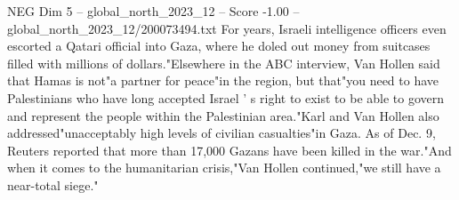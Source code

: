 \begin{textsample}{NEG Dim 5 – global\_north\_2023\_12 – Score -1.00 – global\_north\_2023\_12/200073494.txt}
For years, Israeli intelligence officers even escorted a Qatari official into Gaza, where he doled out money from suitcases filled with millions of dollars."Elsewhere in the ABC interview, Van Hollen said that Hamas is not"a partner for peace"in the region, but that"you need to have Palestinians who have long accepted Israel ' s right to exist to be able to govern and represent the people within the Palestinian area."Karl and Van Hollen also addressed"unacceptably high levels of civilian casualties"in Gaza.
As of Dec. 9, Reuters reported that more than 17,000 Gazans have been killed in the war."And when it comes to the humanitarian crisis,"Van Hollen continued,"we still have a near-total siege."

\end{textsample}
